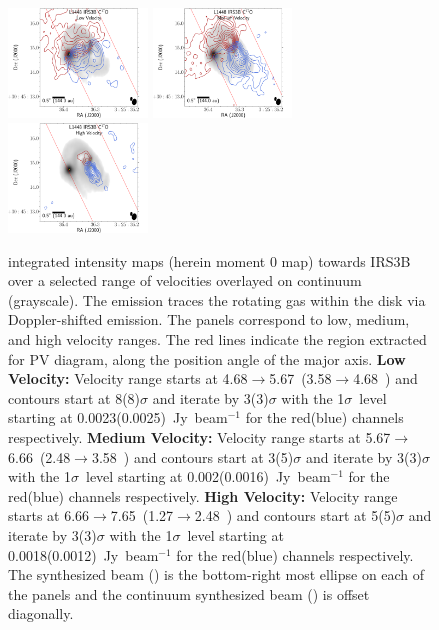 \begin{figure}[H]
\begin{center}
   \includegraphics[width=0.33\textwidth]{img/L1448IRS3B_C17O_image_taper1500k__splitMoments_low.pdf} 
   \includegraphics[width=0.33\textwidth]{img/L1448IRS3B_C17O_image_taper1500k__splitMoments_med.pdf} 
   \includegraphics[width=0.33\textwidth]{img/L1448IRS3B_C17O_image_taper1500k__splitMoments_high.pdf}  %
\end{center}
   \caption{\cso\space integrated intensity maps (herein moment 0 map) towards IRS3B over a selected range of velocities overlayed on continuum (grayscale). The \cso\space emission traces the rotating gas within the disk via Doppler-shifted emission. The panels correspond to low, medium, and high velocity ranges.%
   The red lines indicate the region extracted for PV diagram, along the position angle of the major axis. \textbf{Low Velocity:} Velocity range starts at 4.68$\rightarrow$5.67~\kms (3.58$\rightarrow$4.68~\kms) and contours start at 8(8)$\sigma$ and iterate by 3(3)$\sigma$ with the 1$\sigma$~level starting at 0.0023(0.0025)~Jy~beam$^{-1}$ for the red(blue) channels respectively. \textbf{Medium Velocity:} Velocity range starts at 5.67$\rightarrow$6.66~\kms (2.48$\rightarrow$3.58~\kms) and contours start at 3(5)$\sigma$ and iterate by 3(3)$\sigma$ with the 1$\sigma$~level starting at 0.002(0.0016)~Jy~beam$^{-1}$ for the red(blue) channels respectively. \textbf{High Velocity:} Velocity range starts at 6.66$\rightarrow$7.65~\kms (1.27$\rightarrow$2.48~\kms) and contours start at 5(5)$\sigma$ and iterate by 3(3)$\sigma$ with the 1$\sigma$~level starting at 0.0018(0.0012)~Jy~beam$^{-1}$ for the red(blue) channels respectively. The \cso\space synthesized beam (\csobeam) is the bottom-right most ellipse on each of the panels and the continuum synthesized beam (\contbeam) is offset diagonally.}\label{fig:irs3bc17omoment}
\end{figure}
